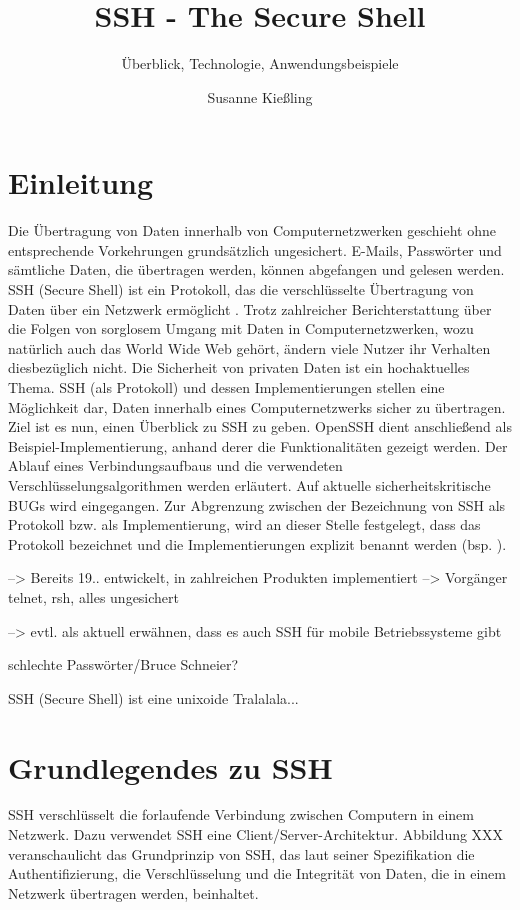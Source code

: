 \documentclass[ngerman,pdf]{wkcms}    %
\title{SSH - The Secure Shell}
\subtitle{Überblick, Technologie, Anwendungsbeispiele}
\author{Susanne Kießling}
\date{\todaylong}
\begin{document}
\maketitle


\section{Einleitung}

Die Übertragung von Daten innerhalb von Computernetzwerken geschieht ohne
entsprechende Vorkehrungen grundsätzlich ungesichert. E-Mails, Passwörter und sämtliche Daten, die übertragen werden, können abgefangen und gelesen werden. SSH (Secure Shell) ist ein Protokoll, das die verschlüsselte Übertragung von Daten über ein Netzwerk ermöglicht \cite{SSH}.
Trotz zahlreicher Berichterstattung über die Folgen von sorglosem Umgang mit Daten in Computernetzwerken, wozu natürlich auch das World Wide Web gehört, ändern viele Nutzer
ihr Verhalten diesbezüglich nicht. Die Sicherheit von privaten Daten ist ein hochaktuelles Thema. SSH (als Protokoll) und dessen Implementierungen stellen eine Möglichkeit dar, Daten innerhalb eines Computernetzwerks sicher zu übertragen. Ziel ist es nun, einen Überblick zu SSH zu geben. OpenSSH dient anschließend als Beispiel-Implementierung, anhand derer die Funktionalitäten gezeigt werden. Der Ablauf eines Verbindungsaufbaus und die verwendeten Verschlüsselungsalgorithmen werden erläutert. Auf aktuelle sicherheitskritische BUGs wird eingegangen. Zur Abgrenzung zwischen der Bezeichnung von SSH als Protokoll bzw. als Implementierung, wird an dieser Stelle festgelegt, dass  das Protokoll bezeichnet und die Implementierungen explizit benannt werden (bsp. ).

--> Bereits 19.. entwickelt, in zahlreichen Produkten implementiert
--> Vorgänger telnet, rsh, alles ungesichert

--> evtl. als aktuell erwähnen, dass es auch SSH für mobile Betriebssysteme gibt

 schlechte Passwörter/Bruce Schneier?

SSH (Secure Shell) ist eine unixoide Tralalala...



\newpage

\section{Grundlegendes zu SSH}


SSH verschlüsselt die forlaufende Verbindung zwischen Computern in einem Netzwerk. Dazu verwendet SSH eine Client/Server-Architektur. Abbildung XXX veranschaulicht das Grundprinzip von SSH, das laut seiner Spezifikation die Authentifizierung, die Verschlüsselung und die Integrität von Daten, die in einem Netzwerk übertragen werden, beinhaltet.
\end{document}
